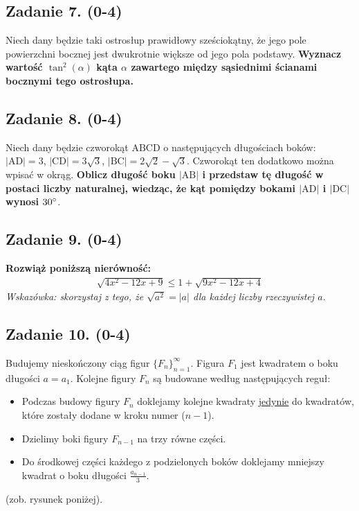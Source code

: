 \documentclass[11pt,a4paper]{scrartcl}
\theoremstyle{definition}
\begin{document}
\subsection*{Zadanie 7. (0-4)}
Niech dany będzie taki ostrosłup prawidłowy sześciokątny, że jego pole powierzchni bocznej jest dwukrotnie większe od jego pola podstawy. \textbf{Wyznacz wartość $\tan^{2}(\alpha)$ kąta $\alpha$ zawartego między sąsiednimi ścianami bocznymi tego ostrosłupa.}

\subsection*{Zadanie 8. (0-4)}
Niech dany będzie czworokąt $\mathrm{ABCD}$ o następujących długościach boków: $|\mathrm{AD}|=3$, $|\mathrm{CD}|=3\sqrt{3}$, $|\mathrm{BC}|=2\sqrt{2}-\sqrt{3}$. Czworokąt ten dodatkowo można wpisać w okrąg. \textbf{Oblicz długość boku $|\mathrm{AB}|$ i przedstaw tę długość w postaci liczby naturalnej, wiedząc, że kąt pomiędzy bokami $|\mathrm{AD}|$ i $|\mathrm{DC}|$ wynosi $30\degree$}.

\subsection*{Zadanie 9. (0-4)}
\textbf{Rozwiąż poniższą nierówność:}
\begin{align*}
\sqrt{4x^{2}-12x+9}\leq 1+\sqrt{9x^{2}-12x+4}
\end{align*}
\emph{Wskazówka: skorzystaj z tego, że $\sqrt{a^{2}}=|a|$ dla każdej liczby rzeczywistej $a$.}


\subsection*{Zadanie 10. (0-4)}
Budujemy nieskończony ciąg figur $\{F_n\}_{n=1}^\infty$.
Figura $F_1$ jest kwadratem o boku długości $a=a_{1}$.
Kolejne figury $F_n$ są budowane według następujących reguł:
\begin{itemize}
    \item Podczas budowy figury $F_{n}$ doklejamy kolejne kwadraty \underline{jedynie} do kwadratów, które zostały dodane w kroku numer ($n-1$). 
    \item Dzielimy boki figury $F_{n-1}$ na trzy równe części.
    \item Do środkowej części każdego z podzielonych boków doklejamy mniejszy kwadrat o boku długości $\frac{a_{n-1}}{3}$.
\end{itemize}
(zob. rysunek poniżej).
\end{document}
